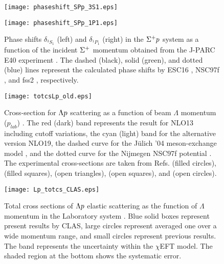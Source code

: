 \begin{figure}[!h]
  \begin{minipage}[t]{0.48\columnwidth}
    \centering
    \texttt{[image: phaseshift\_SPp\_3S1.eps]}
  \end{minipage}
  \hspace{0.04\columnwidth} %
  \begin{minipage}[t]{0.48\columnwidth}
    \centering
    \texttt{[image: phaseshift\_SPp\_1P1.eps]}
  \end{minipage}
  \caption{Phase shifts $\delta_{^3S_1}$ (left) and $\delta_{^1P_1}$ (right) in the $\Sigma^{+}p$ system as a function of the incident $\Sigma^{+}$ momentum obtained from the J-PARC E40 experiment \cite{Nana-SPp}. The dashed (black), solid (green), and dotted (blue) lines represent the calculated phase shifts by ESC16 \cite{ESC16}, NSC97f \cite{OBE-1999}, and fss2 \cite{Fujiwara-2007}, respectively.}
  \label{fig-phaseshift_SPp}
\end{figure}

%
\begin{figure}[h!]
 \begin{center}
   \texttt{[image: totcsLp\_old.eps]}
   \caption{Cross-section for $\Lambda p$ scattering as a function of beam $\Lambda$ momentum ($p_{lab}$) \cite{chiEFT-2020}. The red (dark) band represents the result for NLO13 \cite{NLO13} including cutoff variations, the cyan (light) band for the alternative version NLO19, the dashed curve for the J\"{u}lich '04 meson-exchange model \cite{chiEFT-2005}, and the dotted curve for the Nijmegen NSC97f potential \cite{NSC97f}. The experimental cross-sections are taken from Refs. \cite{Lp-1968_Sechi} (filled circles), \cite{Lp-1968_Alex} (filled squares), \cite{Lp-1967_Herndon} (open triangles), \cite{Lp-1971} (open squares), and \cite{Lp-1977_Hauptman} (open circles).}
   \label{fig-totcsLp_old}
 \end{center}
\end{figure}

\begin{figure}[h!]
 \begin{center}
   \texttt{[image: Lp\_totcs\_CLAS.eps]}
   \caption{Total cross sections of $\Lambda p$ elastic scattering as the function of $\Lambda$ momentum in the Laboratory system  \cite{Lp-2021}. Blue solid boxes represent present results by CLAS, large circles represent averaged one over a wide momentum range, and small circles represent previous results. The band represents the uncertainty within the $\chi$EFT model. The shaded region at the bottom shows the systematic error.}
   \label{fig-Lp_totcs_CLAS}
 \end{center}
\end{figure}

